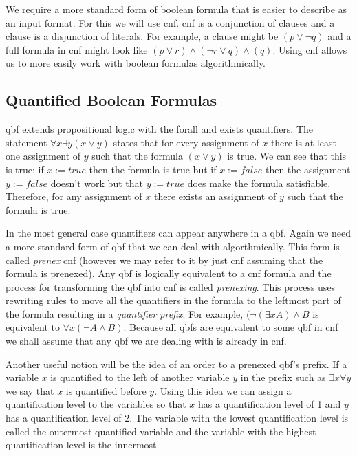 We require a more standard form of boolean formula that is easier to describe as an input format. For this we will use \gls{cnf}. \Gls{cnf} is a conjunction of clauses and a clause is a disjunction of literals. For example, a clause might be $(p \lor \neg q)$ and a full formula in \gls{cnf} might look like $(p \lor r) \land (\neg r \lor q) \land (q)$. Using \gls{cnf} allows us to more easily work with boolean formulas algorithmically.

\subsection{Quantified Boolean Formulas}
\Gls{qbf} extends propositional logic with the \gls{forall} and \gls{exists} quantifiers. The statement $\forall x \exists y (x \lor y)$ states that for every assignment of $x$ there is at least one assignment of $y$ such that the formula $(x \lor y)$ is true. We can see that this is true; if $x := true$ then the formula is true but if $x := false$ then the assignment $y := false$ doesn't work but that $y := true$ does make the formula satisfiable. Therefore, for any assignment of $x$ there exists an assignment of $y$ such that the formula is true.

In the most general case quantifiers can appear anywhere in a \gls{qbf}. Again we need a more standard form of \gls{qbf} that we can deal with algorthmically. This form is called \textit{prenex} \gls{cnf} (however we may refer to it by just \gls{cnf} assuming that the formula is prenexed). Any \gls{qbf} is logically equivalent to a \gls{cnf} formula and the process for transforming the \gls{qbf} into \gls{cnf} is called \textit{prenexing}. This process uses rewriting rules to move all the quantifiers in the formula to the leftmost part of the formula resulting in a \textit{quantifier prefix}. For example, $(\neg (\exists x A) \land B$ is equivalent to $\forall x (\neg A \land B)$. Because all \glspl{qbf} are equivalent to some \gls{qbf} in \gls{cnf} we shall assume that any \gls{qbf} we are dealing with is already in \gls{cnf}.

Another useful notion will be the idea of an order to a prenexed \gls{qbf}'s prefix. If a variable $x$ is quantified to the left of another variable $y$ in the prefix such as $\exists x \forall y$ we say that $x$ is quantified before $y$. Using this idea we can assign a quantification level to the variables so that $x$ has a quantification level of 1 and $y$ has a quantification level of 2. The variable with the lowest quantification level is called the outermost quantified variable and the variable with the highest quantification level is the innermost.

